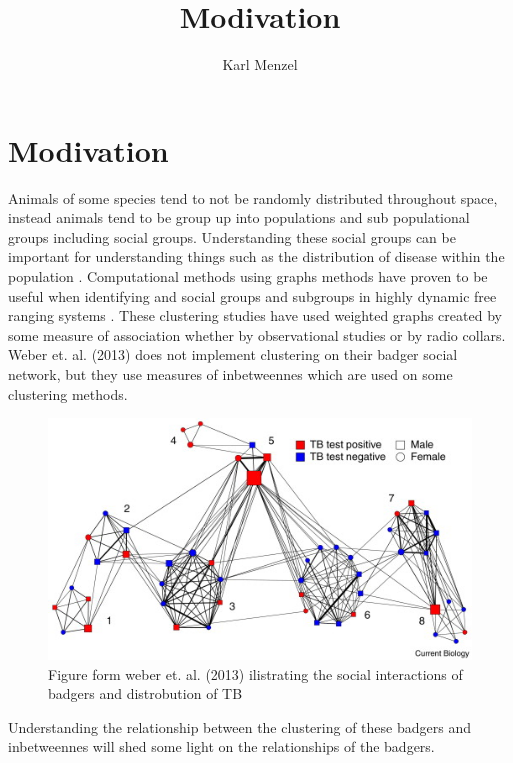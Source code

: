 \documentclass[11pt]{article}
\title{Modivation}
\author{Karl Menzel}
\begin{document}
\maketitle

\section{Modivation}
\indent Animals of some species tend to not be randomly distributed throughout space, instead animals tend to be group up into populations and sub populational groups including social groups.  Understanding these social groups can be important for understanding things such as the distribution of disease within the population \cite{weber-2013}.  Computational methods using graphs methods have proven to be useful when identifying and social groups and subgroups in highly dynamic free ranging systems \cite{Ramos-Fernandez-2009,marsh-2011}.  These clustering studies have used weighted graphs created by some measure of association whether by observational studies or by radio collars. Weber et. al. (2013) does not implement clustering on their badger social network, but they use measures of inbetweennes which are used on some clustering methods.
\begin{figure}
\includegraphics[width=\linewidth]{weberImage.jpg}
\caption{Figure form weber et. al. (2013) ilistrating the social interactions of badgers and distrobution of TB} %
\label{badger} %
\end{figure}   Understanding the relationship between the clustering of these badgers and inbetweennes will shed some light on the relationships of the badgers. 
\end{document}
